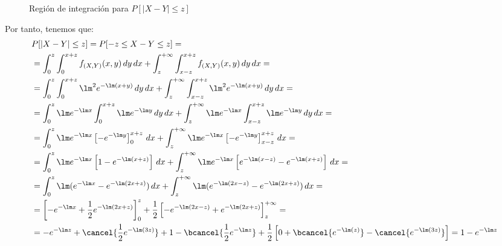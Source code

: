 \begin{ejercicio}
\begin{enumerate}
\begin{figure}
            \caption{Región de integración para $P[|X-Y|\leq z]$}
            \label{fig:|X-Y|_z}
        \end{figure}

        Por tanto, tenemos que:
        \begin{align*}
            &P[|X-Y|\leq z]=P[-z\leq X-Y\leq z]=\\
            &= \int_{0}^{z}\int_{0}^{x+z} f_{(X,Y)}(x,y) \, dy \, dx
            + \int_{z}^{+\infty}\int_{x-z}^{x+z} f_{(X,Y)}(x,y) \, dy \, dx
            =\\&= \int_{0}^{z}\int_{0}^{x+z} \lm^2 e^{-\lm(x+y)} \, dy \, dx
            + \int_{z}^{+\infty}\int_{x-z}^{x+z} \lm^2 e^{-\lm(x+y)} \, dy \, dx
            =\\&= \int_{0}^{z}\lm e^{-\lm x}\int_{0}^{x+z} \lm e^{-\lm y} \, dy \, dx
            + \int_{z}^{+\infty}\lm e^{-\lm x}\int_{x-z}^{x+z} \lm e^{-\lm y} \, dy \, dx
            =\\&= \int_{0}^{z}\lm e^{-\lm x}\left[-e^{-\lm y}\right]_{0}^{x+z} \, dx
            + \int_{z}^{+\infty}\lm e^{-\lm x}\left[-e^{-\lm y}\right]_{x-z}^{x+z} \, dx
            =\\&= \int_{0}^{z}\lm e^{-\lm x}\left[1-e^{-\lm (x+z)}\right] \, dx
            + \int_{z}^{+\infty}\lm e^{-\lm x}\left[e^{-\lm(x-z)}-e^{-\lm (x+z)}\right] \, dx
            =\\&= \int_{0}^{z} \lm(e^{-\lm x}-e^{-\lm (2x+z)}) \, dx
            + \int_{z}^{+\infty} \lm(e^{-\lm (2x-z)}-e^{-\lm (2x+z)}) \, dx
            =\\&= \left[-e^{-\lm x}+\dfrac{1}{2}e^{-\lm (2x+z)}\right]_{0}^{z}
            + \dfrac{1}{2}\left[-e^{-\lm (2x-z)}+e^{-\lm (2x+z)}\right]_{z}^{+\infty}
            =\\&= -e^{-\lm z}+\cancel{\dfrac{1}{2}e^{-\lm (3z)}}+1-\bcancel{\dfrac{1}{2}e^{-\lm z}}
            + \dfrac{1}{2}\left[0+\bcancel{e^{-\lm (z)}}-\cancel{e^{-\lm (3z)}}\right]
            = 1-e^{-\lm z}
        \end{align*}


\end{enumerate}
\end{ejercicio}
